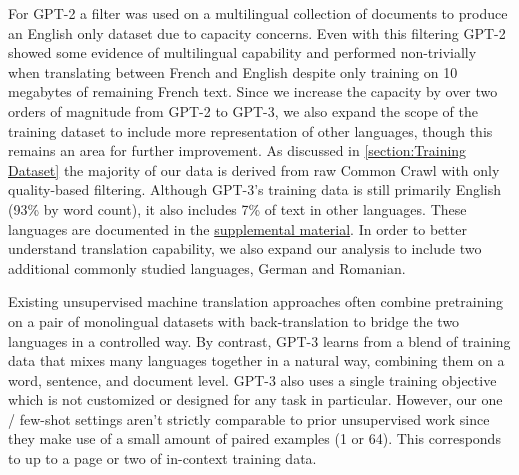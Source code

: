 
For GPT-2 a filter was used on a multilingual collection of documents to produce an English only dataset due to capacity concerns. Even with this filtering GPT-2 showed some evidence of multilingual capability and performed non-trivially when translating between French and English despite only training on 10 megabytes of remaining French text. Since we increase the capacity by over two orders of magnitude from GPT-2 to GPT-3, we also expand the scope of the training dataset to include more representation of other languages, though this remains an area for further improvement. As discussed in \ref{section:Training Dataset} the majority of our data is derived from raw Common Crawl with only quality-based filtering. Although GPT-3's training data is still primarily English (93\% by word count), it also includes 7\% of text in other languages. These languages are documented in the \href{https://github.com/openai/gpt-3}{supplemental material}. In order to better understand translation capability, we also expand our analysis to include two additional commonly studied languages, German and Romanian.

Existing unsupervised machine translation approaches often combine pretraining on a pair of monolingual datasets with back-translation \cite{sennrich2015improving} to bridge the two languages in a controlled way. By contrast, GPT-3 learns from a blend of training data that mixes many languages together in a natural way, combining them on a word, sentence, and document level. GPT-3 also uses a single training objective which is not customized or designed for any task in particular. However, our one / few-shot settings aren't strictly comparable to prior unsupervised work since they make use of a small amount of paired examples (1 or 64). This corresponds to up to a page or two of in-context training data. 


